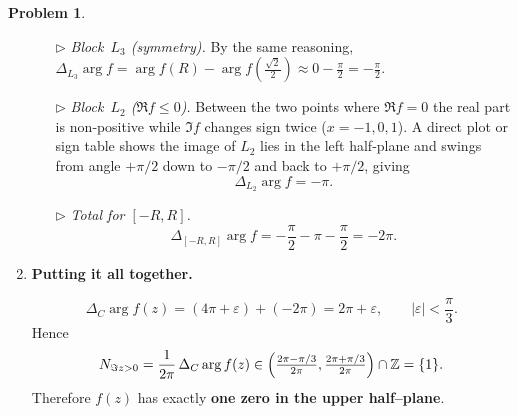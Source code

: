 \documentclass[12pt]{article}
\theoremstyle{definition} %
\newtheorem{problem}{Problem}
\theoremstyle{plain} %
\begin{document}
\begin{problem}
\begin{enumerate}
\begin{enumerate}
          \item[$\triangleright$] \emph{Block $L_{3}$ (symmetry).}  
                By the same reasoning,
                \(
                    \Delta_{L_{3}}\arg f
                    =\arg f(R)-\arg f(\tfrac{\sqrt2}{2})
                    \approx 0-\frac{\pi}{2}=-\frac{\pi}{2}.
                \)

          \item[$\triangleright$] \emph{Block $L_{2}$ ($\Re f\le0$).}  
                Between the two points where $\Re f=0$ the real part is
                non‑positive while $\Im f$ changes sign twice ($x=-1,0,1$).  
                A direct plot or sign table shows the image of $L_{2}$ lies in
                the left half‑plane and swings from angle $+\pi/2$ down to
                $-\pi/2$ and back to $+\pi/2$, giving
                \[
                    \Delta_{L_{2}}\arg f=-\pi.
                \]

          \item[$\triangleright$] \emph{Total for $[-R,R]$.}
                \[
                    \Delta_{[-R,R]}\arg f
                    = -\frac{\pi}{2}-\pi-\frac{\pi}{2}
                    = -2\pi.
                \]
          \end{enumerate}

    \item \textbf{Putting it all together.}

          \[
              \Delta_{C}\arg f(z)
              = (4\pi+\varepsilon) + (-2\pi)
              = 2\pi+\varepsilon,
              \qquad |\varepsilon|<\frac{\pi}{3}.
          \]
          Hence
          \[
              N_{\Im z>0}
              =\frac{1}{2\pi}\,\Delta_{C}\arg f(z)
              \in\Bigl(\tfrac{2\pi-\pi/3}{2\pi},\tfrac{2\pi+\pi/3}{2\pi}\Bigr)
              \cap\mathbb Z
              =\{1\}.
          \]
          Therefore $f(z)$ has exactly \textbf{one zero in the upper
          half–plane}.
    \end{enumerate}
\end{problem}
\end{document}
